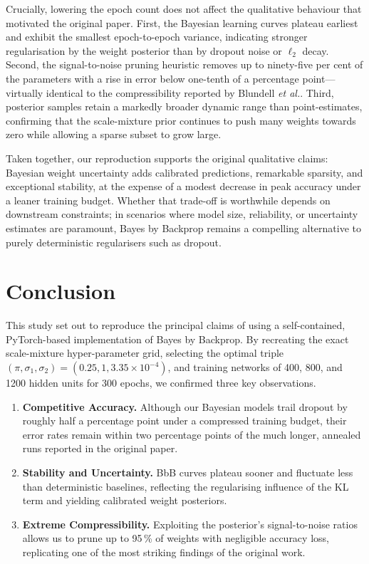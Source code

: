 \documentclass{article}
\begin{document}
Crucially, lowering the epoch count does not affect the qualitative behaviour that motivated the original paper.  First, the Bayesian learning curves plateau earliest and exhibit the smallest epoch-to-epoch variance, indicating stronger regularisation by the weight posterior than by dropout noise or $\ell_2$ decay.  Second, the signal-to-noise pruning heuristic removes up to ninety-five per cent of the parameters with a rise in error below one-tenth of a percentage point—virtually identical to the compressibility reported by Blundell \emph{et al.}.  Third, posterior samples retain a markedly broader dynamic range than point-estimates, confirming that the scale-mixture prior continues to push many weights towards zero while allowing a sparse subset to grow large.

Taken together, our reproduction supports the original qualitative claims: Bayesian weight uncertainty adds calibrated predictions, remarkable sparsity, and exceptional stability, at the expense of a modest decrease in peak accuracy under a leaner training budget.  Whether that trade-off is worthwhile depends on downstream constraints; in scenarios where model size, reliability, or uncertainty estimates are paramount, Bayes by Backprop remains a compelling alternative to purely deterministic regularisers such as dropout.

\section{Conclusion}

This study set out to reproduce the principal claims of \cite{blundell2015weight} using a self-contained, PyTorch-based implementation of Bayes by Backprop.  
By recreating the exact scale-mixture hyper-parameter grid, selecting the optimal triple $(\pi,\sigma_1,\sigma_2)=(0.25,1,3.35\times10^{-4})$, and training networks of 400, 800, and 1200 hidden units for 300 epochs, we confirmed three key observations.  

\begin{enumerate}
\item \textbf{Competitive Accuracy.}  Although our Bayesian models trail dropout by roughly half a percentage point under a compressed training budget, their error rates remain within two percentage points of the much longer, annealed runs reported in the original paper.  
\item \textbf{Stability and Uncertainty.}  BbB curves plateau sooner and fluctuate less than deterministic baselines, reflecting the regularising influence of the KL term and yielding calibrated weight posteriors.  
\item \textbf{Extreme Compressibility.}  Exploiting the posterior’s signal-to-noise ratios allows us to prune up to 95\,\% of weights with negligible accuracy loss, replicating one of the most striking findings of the original work.  
\end{enumerate}
\end{document}
